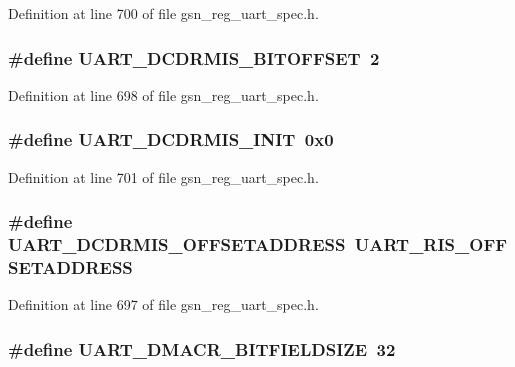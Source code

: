Definition at line 700 of file gsn\_\-reg\_\-uart\_\-spec.h.

\hypertarget{a00575_a69b5d7d84087fed943513bd5c90c6bbb}{
\subsubsection[{UART\_\-DCDRMIS\_\-BITOFFSET}]{\setlength{\rightskip}{0pt plus 5cm}\#define UART\_\-DCDRMIS\_\-BITOFFSET~2}}
\label{a00575_a69b5d7d84087fed943513bd5c90c6bbb}


Definition at line 698 of file gsn\_\-reg\_\-uart\_\-spec.h.

\hypertarget{a00575_af637fd422233478ddabc97fe9f9248c0}{
\subsubsection[{UART\_\-DCDRMIS\_\-INIT}]{\setlength{\rightskip}{0pt plus 5cm}\#define UART\_\-DCDRMIS\_\-INIT~0x0}}
\label{a00575_af637fd422233478ddabc97fe9f9248c0}


Definition at line 701 of file gsn\_\-reg\_\-uart\_\-spec.h.

\hypertarget{a00575_a0e75df8108c9595e72b2183da87c2766}{
\subsubsection[{UART\_\-DCDRMIS\_\-OFFSETADDRESS}]{\setlength{\rightskip}{0pt plus 5cm}\#define UART\_\-DCDRMIS\_\-OFFSETADDRESS~UART\_\-RIS\_\-OFFSETADDRESS}}
\label{a00575_a0e75df8108c9595e72b2183da87c2766}


Definition at line 697 of file gsn\_\-reg\_\-uart\_\-spec.h.

\hypertarget{a00575_a39bcf78220b89d5d6682cbf6d42208d6}{
\subsubsection[{UART\_\-DMACR\_\-BITFIELDSIZE}]{\setlength{\rightskip}{0pt plus 5cm}\#define UART\_\-DMACR\_\-BITFIELDSIZE~32}}
\label{a00575_a39bcf78220b89d5d6682cbf6d42208d6}


